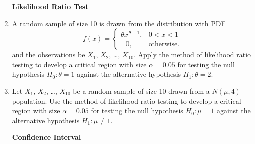 \documentclass[11pt, a4paper]{article}
\begin{document}
\begin{enumerate}
	
	
	
	
	
	
\newpage

\begin{center}

\textbf{\huge Likelihood Ratio Test}

\end{center}


\vspace{50pt}	
	
	
	
	
	
	\item A random sample of size 10 is drawn from the distribution with PDF 
	\begin{equation*}
	f(x) = 
		\begin{cases}
		\theta x^{\theta - 1}, & 0 < x < 1 \\
		\hspace{8pt} 0, & \text{otherwise.}
		\end{cases}	
	\end{equation*}
	and the observations be $X_1$, $X_2$, \ldots, $X_{10}$. Apply the method of likelihood ratio testing to develop a critical region with size $\alpha = 0.05$ for testing the null hypothesis $H_0 : \theta = 1$ against the alternative hypothesis $H_1 : \theta = 2$.
	
	
	
	
	
	
	
	
\vspace{50pt}	
	
	
	
	
	\item Let $X_1$, $X_2$, \ldots, $X_{10}$ be a random sample of size 10 drawn from a $N(\mu, 4)$ population. Use the method of likelihood ratio testing to develop a critical region with size $\alpha = 0.05$ for testing the null hypothesis $H_0 : \mu = 1$ against the alternative hypothesis $H_1 : \mu \neq 1$.
	
	
	
	
	

\newpage

\begin{center}

\textbf{\huge Confidence Interval}

\end{center}


\vspace{50pt}	
	

\end{enumerate}
\end{document}
